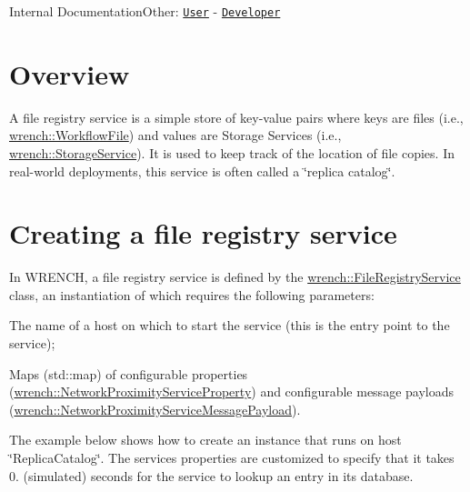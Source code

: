 Internal DocumentationOther\+: \href{../user/guide-fileregistry.html}{\tt User} -\/ \href{../developer/guide-fileregistry.html}{\tt Developer}\hypertarget{guide-fileregistry_guide-fileregistry-overview}{}\section{Overview}\label{guide-fileregistry_guide-fileregistry-overview}
A file registry service is a simple store of key-\/value pairs where keys are files (i.\+e., {\ttfamily \hyperlink{classwrench_1_1_workflow_file}{wrench\+::\+Workflow\+File}}) and values are Storage Services (i.\+e., {\ttfamily \hyperlink{classwrench_1_1_storage_service}{wrench\+::\+Storage\+Service}}). It is used to keep track of the location of file copies. In real-\/world deployments, this service is often called a \char`\"{}replica catalog\char`\"{}.\hypertarget{guide-fileregistry_guide-fileregistry-creating}{}\section{Creating a file registry service}\label{guide-fileregistry_guide-fileregistry-creating}
In W\+R\+E\+N\+CH, a file registry service is defined by the {\ttfamily \hyperlink{classwrench_1_1_file_registry_service}{wrench\+::\+File\+Registry\+Service}} class, an instantiation of which requires the following parameters\+:


\begin{DoxyItemize}
\item The name of a host on which to start the service (this is the entry point to the service);
\item Maps ({\ttfamily std\+::map}) of configurable properties ({\ttfamily \hyperlink{classwrench_1_1_network_proximity_service_property}{wrench\+::\+Network\+Proximity\+Service\+Property}}) and configurable message payloads ({\ttfamily \hyperlink{classwrench_1_1_network_proximity_service_message_payload}{wrench\+::\+Network\+Proximity\+Service\+Message\+Payload}}).
\end{DoxyItemize}

The example below shows how to create an instance that runs on host \char`\"{}\+Replica\+Catalog\char`\"{}. The service\textquotesingle{}s properties are customized to specify that it takes 0. (simulated) seconds for the service to lookup an entry in its database.


